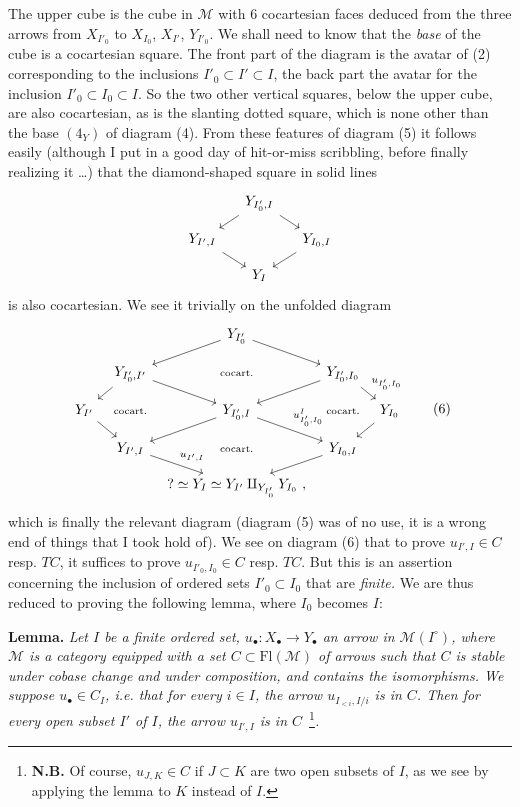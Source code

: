 \documentclass[11pt]{article}
\newcommand{\printedpage}[1]{\marginpar{\footnotesize p.~#1}}
\newcommand{\msp}[1]{\marginpar{\footnotesize [#1]}}
\newcommand{\cocart}{\text{\scriptsize cocart.}}
\begin{document}
The upper cube is the cube in $\mathcal{M}$ with 6 cocartesian faces deduced from the three arrows from $X_{I'_0}$ to $X_{I_0}$, $X_{I'}$, $Y_{I'_0}$. %
We shall need to know that the \textit{base} of the cube is a cocartesian square. The front part of the diagram is the avatar of (2) corresponding to the inclusions $I'_0 \subset I' \subset I$, the back part the avatar for the inclusion $I'_0 \subset I_0 \subset I$. So the two other vertical squares, below the upper cube, are also cocartesian, as is the slanting dotted square, which is none other than the base $(4_Y)$ of diagram (4). From these features of diagram (5) it follows easily (although \msp{page 17} I put in a good day of hit-or-miss scribbling, before finally realizing it \ldots) that the diamond-shaped square in solid lines
\[
\begin{tikzcd}[column sep=small, row sep=small]
 & Y_{I'_0,I} \arrow[dl] \arrow[dr] & \\
Y_{I',I} \arrow[dr] & & Y_{I_0,I} \arrow[dl] \\
 & Y_I &
\end{tikzcd}
\]
is also cocartesian. We see it trivially on the unfolded diagram
\printedpage{11}
\[
\begin{tikzcd}[column sep=tiny, row sep=small]
 & & Y_{I'_0} \arrow[dl] \arrow[dr] & & \\
 & Y_{I'_0,I'} \arrow[dl] \arrow[dr] & \cocart & Y_{I'_0,I_0} \arrow[dl] \arrow[dr, "u_{I'_0,I_0}"] & \\
Y_{I'} \arrow[dr] & \cocart & Y_{I'_0,I} \arrow[dl] \arrow[dr, "u^I_{I'_0,I_0}"] & \cocart & Y_{I_0} \arrow[dl] \\
 & Y_{I',I} \arrow[dr, "u_{I',I}"] & \cocart & Y_{I_0,I} \arrow[dl] & \\
 & & {?\simeq Y_I \simeq Y_{I'} \amalg_{Y_{I'_0}} Y_{I_0}\ ,} & &
\end{tikzcd} %
\tag*{(6)}
\]
which is finally the relevant diagram (diagram (5) was of no use, it is a wrong end of things that I took hold of). We see on diagram (6) that to prove $u_{I',I} \in C$ resp. $TC$, it \msp{page 18} suffices to prove $u_{I'_0,I_0} \in C$ resp. $TC$. But this is an assertion concerning the inclusion of ordered sets $I'_0 \subset I_0$ that are \textit{finite.} We are thus reduced to proving the following lemma, where $I_0$ becomes $I$:

\textbf{Lemma.} \textit{Let $I$ be a finite ordered set, $u_\bullet : X_\bullet \longrightarrow Y_\bullet$ an arrow in $\mathcal{M}(I^\circ)$, where $\mathcal{M}$ is a category equipped with a set $C \subset \mathrm{Fl}(\mathcal{M})$ of arrows such that $C$ is stable under cobase change and under composition, and contains the isomorphisms. We suppose $u_\bullet \in C_I$, i.e. that for every $i \in I$, the arrow $u_{I_{<i},I/i}$ is in $C$. Then for every open subset $I'$ of $I$, the arrow $u_{I',I}$ is in $C$}~\footnote[10]{\textbf{N.B.} Of course, $u_{J,K} \in C$ if $J \subset K$ are two open subsets of $I$, as we see by applying the lemma to $K$ instead of $I$.}\textit{.}
\end{document}
